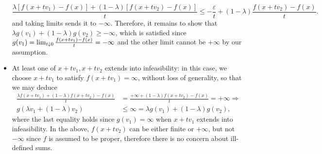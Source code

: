 \documentclass[10pt]{article}
\begin{document}
\begin{Exercise}
\begin{itemize}
        \[
            \frac{\lambda [f(x + tv_1) - f(x)] + (1 - \lambda) [
                f(x + tv_2) - f(x)]}{t} \leq
            -\frac{\varepsilon}{t} + (1 - \lambda) \frac{f(x + tv_2) - f(x)}{t}.
        \]
        and taking limits sends it to $-\infty$. Therefore, it remains to show
        that $\lambda g(v_1) + (1 - \lambda) g(v_2) \geq -\infty$, which is
        satisfied since $g(v_1) = \lim_{t \downarrow 0} \frac{f(x + tv_1) - f(x)}{t}
            = -\infty$ and the other limit cannot be $+\infty$ by our
            assumption.
    \item At least one of $x + tv_1, x + tv_2$ extends into infeasibility: in
        this case, we choose $x + tv_1$ to satisfy $f(x + tv_1) = \infty$,
        without loss of generality, so that we may deduce
        \begin{align}
            \frac{\lambda f(x + tv_1) + (1 - \lambda) f(x + tv_2) - f(x)}{t} &=
            \frac{+\infty + (1 - \lambda) f(x + tv_2) - f(x)}{t} = +\infty
            \Rightarrow \\
            g(\lambda v_1 + (1 - \lambda) v_2) &\leq \infty =
                \lambda g(v_1) + (1 - \lambda) g(v_2),
        \end{align}
        where the last equality holds since $g(v_1) = \infty$ when $x + tv_1$
        extends into infeasibility. In the above, $f(x + tv_2)$ can be either
        finite or $+\infty$, but not $-\infty$ since $f$ is assumed to be
        proper, therefore there is no concern about ill-defined sums.

    \end{itemize}

    \ExePart


\end{Exercise}
\end{document}
